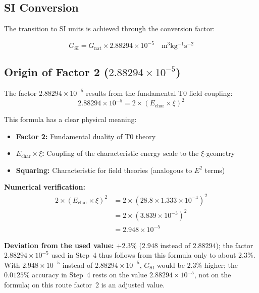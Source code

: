 	\subsection{SI Conversion}
	
	The transition to SI units is achieved through the conversion factor:
	
	\begin{equation}
		\boxed{G_{\text{SI}} = G_{\text{nat}} \times 2.88294 \times 10^{-5} \quad \si{\meter^3 \kilogram^{-1} \second^{-2}}}
	\end{equation}
	
	\subsection{Origin of Factor 2 ($2.88294 \times 10^{-5}$)}
	
	The factor $2.88294 \times 10^{-5}$ results from the fundamental T0 field coupling:
	\begin{equation}
		\boxed{2.88294 \times 10^{-5} = 2 \times (E_{\text{char}} \times \xi)^2}
	\end{equation}
	
	This formula has a clear physical meaning:
	\begin{itemize}
		\item \textbf{Factor 2:} Fundamental duality of T0 theory
		\item \textbf{$E_{\text{char}} \times \xi$:} Coupling of the characteristic energy scale to the $\xi$-geometry
		\item \textbf{Squaring:} Characteristic for field theories (analogous to $E^2$ terms)
	\end{itemize}
	
	\textbf{Numerical verification:}
	\begin{align}
		2 \times (E_{\text{char}} \times \xi)^2 &= 2 \times (28.8 \times 1.333 \times 10^{-4})^2 \\
		&= 2 \times (3.839 \times 10^{-3})^2 \\
		&= 2.948 \times 10^{-5}
	\end{align}
	
	\textbf{Deviation from the used value:} $+2.3\%$ ($2.948$ instead of $2.88294$); the factor $2.88294 \times 10^{-5}$ used in Step~4 thus follows from this formula only to about $2.3\%$. With $2.948 \times 10^{-5}$ instead of $2.88294 \times 10^{-5}$, $G_{\text{SI}}$ would be $2.3\%$ higher; the $0.0125\%$ accuracy in Step~4 rests on the value $2.88294 \times 10^{-5}$, not on the formula; on this route factor~2 is an adjusted value.
	
